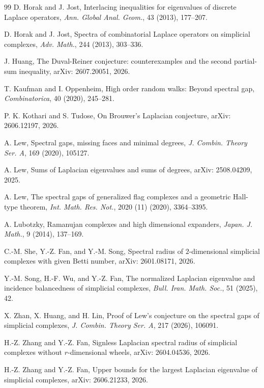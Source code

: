 \documentclass[12pt]{amsart}
\theoremstyle{plain}
\theoremstyle{definition}
\numberwithin{equation}{section}
\numberwithin{figure}{section}
\begin{document}
\begin{thebibliography}{99}
D. Horak and J. Jost,
\newblock Interlacing inequalities for eigenvalues of discrete Laplace operators,
\newblock \emph{Ann. Global Anal. Geom.}, 43 (2013), 177--207.

D. Horak and J. Jost,
\newblock Spectra of combinatorial Laplace operators on simplicial complexes,
\newblock \emph{Adv. Math.}, 244 (2013), 303--336.

J. Huang, 
\newblock The Duval-Reiner conjecture: counterexamples and the second partial-sum inequality,
\newblock arXiv: 2607.20051, 2026.


T. Kaufman and I. Oppenheim,
\newblock High order random walks: Beyond spectral gap,
\newblock \emph{Combinatorica}, 40 (2020), 245--281.

P. K. Kothari and S. Tudose,
\newblock On Brouwer's Laplacian conjecture,
\newblock arXiv: 2606.12197, 2026.

A. Lew,
\newblock Spectral gaps, missing faces and minimal degrees,
\newblock \emph{J. Combin. Theory Ser. A}, 169 (2020), 105127.

A. Lew,
\newblock Sums of Laplacian eigenvalues and sums of degrees,
\newblock arXiv: 2508.04209, 2025.

A. Lew,
\newblock The spectral gaps of generalized flag complexes and a geometric Hall-type theorem,
\newblock \emph{Int. Math. Res. Not.}, 2020 (11) (2020), 3364--3395.

A. Lubotzky,
\newblock Ramanujan complexes and high dimensional expanders,
\newblock \emph{Japan. J. Math.}, 9 (2014), 137--169.

C.-M. She, Y.-Z. Fan, and Y.-M. Song,
\newblock Spectral radius of $2$-dimensional simplicial complexes with given Betti number,
\newblock arXiv: 2601.08171, 2026.

Y.-M. Song, H.-F. Wu, and Y.-Z. Fan,
\newblock The normalized Laplacian eigenvalue and incidence balancedness of simplicial complexes,
\newblock \emph{Bull. Iran. Math. Soc.}, 51 (2025), 42.

X. Zhan, X. Huang, and H. Lin,
\newblock Proof of Lew's conjecture on the spectral gaps of simplicial complexes,
\newblock \emph{J. Combin. Theory Ser. A}, 217 (2026), 106091.

H.-Z. Zhang and Y.-Z. Fan,
\newblock Signless Laplacian spectral radius of simplicial complexes without $r$-dimensional wheels,
\newblock arXiv: 2604.04536, 2026.

H.-Z. Zhang and Y.-Z. Fan,
\newblock Upper bounds for the largest Laplacian eigenvalue of simplicial complexes,
\newblock arXiv: 2606.21233, 2026.
			
\end{thebibliography}
\end{document}
